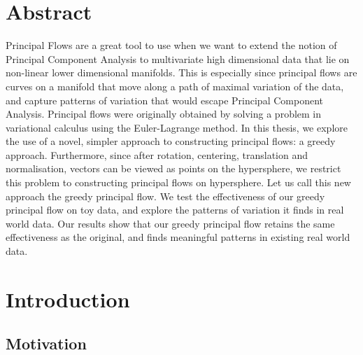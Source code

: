 \documentclass[12pt]{report}
\begin{document}
\chapter*{Abstract}

Principal Flows are a great tool to use when we want to extend the 
notion of Principal Component Analysis to multivariate high dimensional data that 
lie on non-linear lower dimensional manifolds.
This is especially since principal flows are curves on a manifold 
that move along a path of maximal variation of the data, and capture patterns of
variation that would escape Principal Component Analysis.
Principal flows were originally obtained by solving a problem
in variational calculus using the Euler-Lagrange method. 
In this thesis, we explore the use of a novel, simpler approach to constructing 
principal flows: a greedy approach.
Furthermore, since after rotation, centering, translation 
and normalisation, vectors can be viewed as points on the hypersphere, 
we restrict this problem to constructing principal flows on hypersphere.
Let us call this new approach the greedy principal flow.
We test the effectiveness of our greedy principal flow on toy data, and
explore the patterns of variation it finds in real world data. Our results show that
our greedy principal flow retains the same effectiveness as the original, and
finds meaningful patterns in existing real world data.

\newpage
\tableofcontents
\listoffigures
\newpage

\chapter{Introduction}

\section{Motivation}
\end{document}
